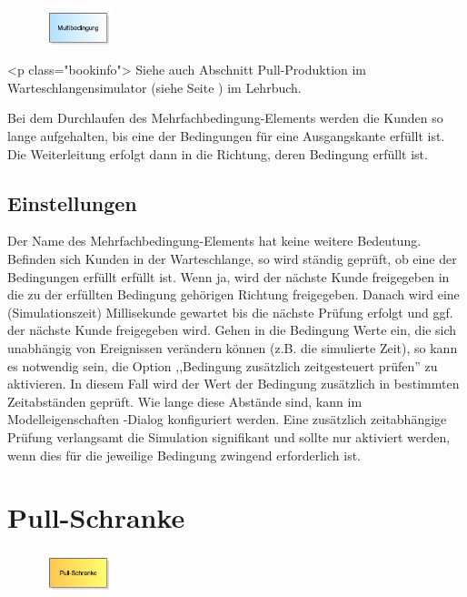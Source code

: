 \begin{figure}
\vspace{-22pt}
\includegraphics[width=2cm]{imageModelElementHoldMulti.png}
\vspace{-22pt}
\end{figure}

<p class="bookinfo">
Siehe auch Abschnitt Pull-Produktion im Warteschlangensimulator (siehe Seite \pageref{ref:book:7.6.3}) im Lehrbuch.

Bei dem Durchlaufen des Mehrfachbedingung-Elements werden die Kunden so lange aufgehalten, bis eine der Bedingungen für eine
Ausgangskante erfüllt ist. Die Weiterleitung erfolgt dann in die Richtung, deren Bedingung erfüllt ist.

\subsection*{Einstellungen}

Der Name des Mehrfachbedingung-Elements hat keine weitere Bedeutung. Befinden sich Kunden in der Warteschlange, so wird ständig geprüft,
ob eine der Bedingungen erfüllt erfüllt ist. Wenn ja, wird der nächste Kunde freigegeben in die zu der erfüllten Bedingung
gehörigen Richtung freigegeben. Danach wird eine (Simulationszeit) Millisekunde gewartet bis die nächste
Prüfung erfolgt und ggf. der nächste Kunde freigegeben wird.
Gehen in die Bedingung Werte ein, die sich unabhängig von Ereignissen verändern können (z.B. die simulierte Zeit), so kann es notwendig sein,
die Option ,,Bedingung zusätzlich zeitgesteuert prüfen'' zu aktivieren. In diesem Fall wird der Wert der Bedingung zusätzlich in bestimmten
Zeitabständen geprüft. Wie lange diese Abstände sind, kann im Modelleigenschaften -Dialog konfiguriert
werden. Eine zusätzlich zeitabhängige Prüfung verlangsamt die Simulation signifikant und sollte nur aktiviert werden, wenn dies für die
jeweilige Bedingung zwingend erforderlich ist.


\section{Pull-Schranke}
\label{ref:ModelElementBarrierPull}

\begin{figure}
\vspace{-22pt}
\includegraphics[width=2cm]{imageModelElementBarrierPull.png}
\vspace{-22pt}
\end{figure}

